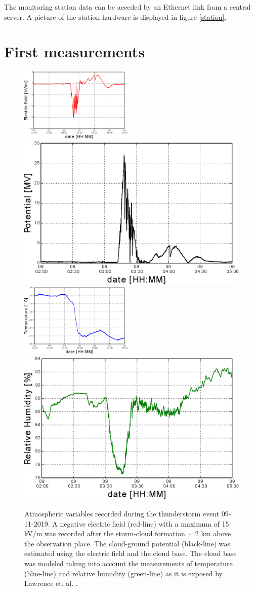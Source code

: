 \documentclass[a4paper]{jpconf}
\begin{document}
The monitoring station data can be acceded by an Ethernet link from a central server. A picture of the station hardware is displayed in figure \ref{station}.

\section{First measurements}

\begin{figure}[h]
\begin{center}
\includegraphics[width=0.48\textwidth]{Figures/Slow.eps}
\includegraphics[width=.48\textwidth]{Figures/Potential.eps}
\includegraphics[width=0.48\textwidth]{Figures/Temperatura.eps}
\includegraphics[width=.48\textwidth]{Figures/Humidity.eps}
\caption{\label{cal_fuente} Atmospheric variables recorded during the thunderstorm event 09-11-2019. A negative electric field (red-line) with a maximum of 15 kV/m was recorded after the storm-cloud formation $\sim$ 2 km above the observation place. The cloud-ground potential (black-line) was estimated using the electric field and the cloud base. The cloud base was modeled taking into account the measurements of temperature (blue-line) and relative humidity (green-line) as it is exposed by Lawrence et. al. \cite{Lawrence2005}.}
\label{cal_fuente}
\end{center}
\end{figure}
\end{document}
